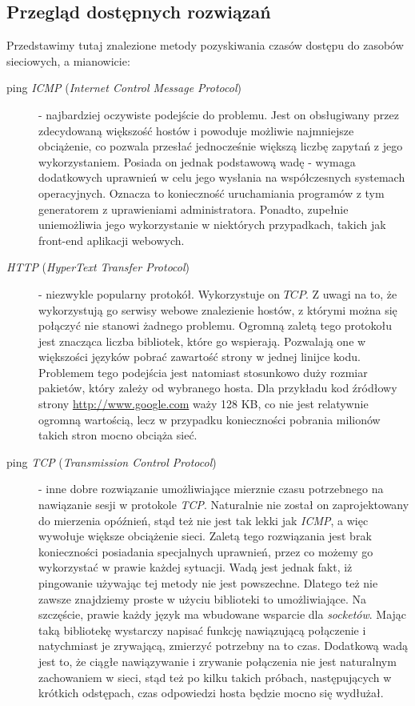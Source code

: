 \subsection{Przegląd dostępnych rozwiązań}
Przedstawimy tutaj znalezione metody pozyskiwania czasów dostępu do zasobów sieciowych, a mianowicie:
\begin{description}
\item[ping \textit{ICMP} (\textit{Internet Control Message Protocol})] - najbardziej oczywiste podejście do problemu. Jest on obsługiwany przez zdecydowaną większość hostów i powoduje możliwie najmniejsze obciążenie, co pozwala przesłać jednocześnie większą liczbę zapytań z jego wykorzystaniem. Posiada on jednak podstawową wadę - wymaga dodatkowych uprawnień w celu jego wysłania na współczesnych systemach operacyjnych. Oznacza to konieczność uruchamiania programów z tym generatorem z uprawieniami administratora. Ponadto, zupełnie uniemożliwia jego wykorzystanie w niektórych przypadkach, takich jak front-end aplikacji webowych.
\item[\textit{HTTP} (\textit{HyperText Transfer Protocol})] - niezwykle popularny protokół. Wykorzystuje on $TCP$. Z uwagi na to, że wykorzystują go serwisy webowe znalezienie hostów, z którymi można się połączyć nie stanowi żadnego problemu. Ogromną zaletą tego protokołu jest znacząca liczba bibliotek, które go wspierają. Pozwalają one w większości języków pobrać zawartość strony w jednej linijce kodu. Problemem tego podejścia jest natomiast stosunkowo duży rozmiar pakietów, który zależy od wybranego hosta. Dla przykładu kod źródłowy strony \url{http://www.google.com} waży 128 KB, co nie jest relatywnie ogromną wartością, lecz w przypadku konieczności pobrania milionów takich stron mocno obciąża sieć.  
\item[ping \textit{TCP} (\textit{Transmission Control Protocol})] - inne dobre rozwiązanie umożliwiające mierznie czasu potrzebnego na nawiązanie sesji w protokole \emph{TCP}. Naturalnie nie został on zaprojektowany do mierzenia opóźnień, stąd też nie jest tak lekki jak \emph{ICMP}, a więc wywołuje większe obciążenie sieci. Zaletą tego rozwiązania jest brak konieczności posiadania specjalnych uprawnień, przez co możemy go wykorzystać w prawie każdej sytuacji. Wadą jest jednak fakt, iż pingowanie używając tej metody nie jest powszechne. Dlatego też nie zawsze znajdziemy proste w użyciu biblioteki to umożliwiające. Na szczęście, prawie każdy język ma wbudowane wsparcie dla \textit{socketów}. Mając taką bibliotekę wystarczy napisać funkcję nawiązującą połączenie i natychmiast je zrywającą, zmierzyć potrzebny na to czas. Dodatkową wadą jest to, że ciągłe nawiązywanie i zrywanie połączenia nie jest naturalnym zachowaniem w sieci, stąd też po kilku takich próbach, następujących w krótkich odstępach, czas odpowiedzi hosta będzie mocno się wydłużał.
\end{description}
